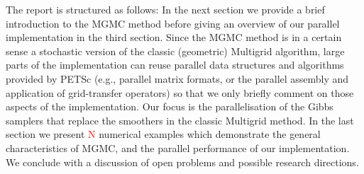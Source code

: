\documentclass[
fontsize=11pt,
paper=a4,
numbers=noenddot
]{scrartcl}
\begin{document}

The report is structured as follows: In the next section we provide a brief introduction to the MGMC method before giving an overview of our parallel implementation in the third section. Since the MGMC method is in a certain sense a stochastic version of the classic (geometric) Multigrid algorithm, large parts of the implementation can reuse parallel data structures and algorithms provided by PETSc (e.g., parallel matrix formats, or the parallel assembly and application of grid-transfer operators) so that we only briefly comment on those aspects of the implementation. Our focus is the parallelisation of the Gibbs samplers that replace the smoothers in the classic Multigrid method. In the last section we present \textcolor{red}{N} numerical examples which demonstrate the general characteristics of MGMC, and the parallel performance of our implementation. We conclude with a discussion of open problems and possible research directions.
\end{document}
